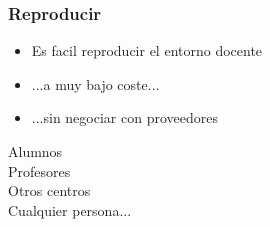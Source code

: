 \documentclass[17pt,aspectratio=169]{beamer}
\begin{document}

\begin{frame}
\frametitle{Reproducir}

\begin{itemize}
\item Es facil reproducir el entorno docente
\item ...a muy bajo coste...
\item ...sin negociar con proveedores
\end{itemize}

\begin{flushright}
  Alumnos \\
  Profesores \\
  Otros centros \\
  Cualquier persona... \\
\end{flushright}
\end{frame}

\end{document}

